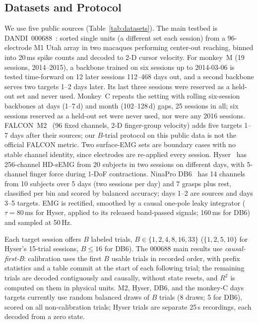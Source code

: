 \subsection{Datasets and Protocol}
\label{sec:datasets}

We use five public sources (Table~\ref{tab:datasets}).
The main testbed is DANDI~000688~\cite{dandi000688,gallego2020stability}: sorted
single units (a different set each session) from a 96-electrode M1 Utah array
in two macaques performing center-out reaching, binned into 20\,ms spike
counts and decoded to 2-D cursor velocity.
For monkey~M (19 sessions, 2014--2015), a backbone trained on six sessions up
to 2014-03-06 is tested time-forward on 12 later sessions 112--468 days out,
and a second backbone serves two targets 1--2 days later. Its last three
sessions were reserved as a held-out set and never used.
Monkey~C repeats the setting with rolling six-session
backbones at days (1--7\,d) and month (102--128\,d) gaps, 25 sessions in all;
six sessions reserved as a held-out set were never used, nor were any 2016
sessions.
FALCON~M2~\cite{karpowicz2024falcon} (96 fixed channels, 2-D finger-group
velocity) adds five targets 1--7 days after their sources; our $B$-trial
protocol on this public data is not the official FALCON metric.
Two surface-EMG sets are boundary cases with no stable channel identity,
since electrodes are re-applied every session. %
Hyser~\cite{jiang2021hyser} has 256-channel HD-sEMG from 20 subjects in two
sessions on different days, with 5-channel finger force during 1-DoF
contractions. NinaPro DB6~\cite{palermo2017repeatability} has 14 channels from
10 subjects over 5 days (two sessions per day) and 7 grasps plus rest,
classified per bin and scored by balanced accuracy; days 1--2 are sources and
days 3--5 targets. EMG is rectified, smoothed by a causal one-pole leaky
integrator ($\tau = 80$\,ms for Hyser, applied to its released band-passed
signals; 160\,ms for DB6) and sampled at 50\,Hz.

Each target session offers $B$ labeled trials, $B \in \{1,2,4,8,16,33\}$
($\{1,2,5,10\}$ for Hyser's 15-trial sessions, $B \le 16$ for DB6).
The 000688 main results use \emph{causal-first-B}: calibration uses the first
$B$ usable trials in recorded order, with prefix statistics and a table commit
at the start of each following trial; the remaining trials are decoded
contiguously and causally, without state resets, and $R^2$ is computed on them
in physical units. M2, Hyser, DB6, and the monkey-C days targets currently use
random balanced draws of $B$ trials (8 draws; 5 for DB6), scored on all
non-calibration trials; Hyser trials are separate 25\,s recordings, each
decoded from a zero state.
